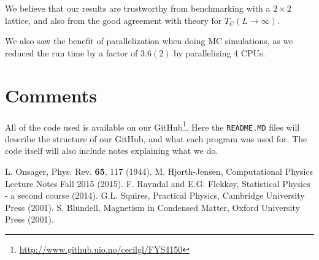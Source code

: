 \documentclass[%
 reprint,
nofootinbib,
aps,
]{revtex4-1}
\begin{document}
We believe that our results are trustworthy from benchmarking with a $2 \times 2$ lattice, and also from the good agreement with theory for $T_C(L\to\infty)$. 

We also saw the benefit of parallelization when doing MC simulations, as we reduced the run time by a factor of $3.6(2)$ by parallelizing 4 CPUs. 



\section{Comments}
All of the code used is available on our GitHub\footnote{\url{http://www.github.uio.no/cecilgl/FYS4150}}. Here the \texttt{README.MD} files will describe the structure of our GitHub, and what each program was used for. The code itself will also include notes explaining what we do.



\begin{thebibliography}{99}
 L. Onsager, Phys. Rev. \textbf{65}, 117 (1944).
 M. Hjorth-Jensen, Computational Physics Lecture Notes Fall 2015 (2015).
 F. Ravndal and E.G. Flekkøy, Statistical Physics - a second course (2014).
 G.L. Squires, Practical Physics, Cambridge University Press (2001).
 S. Blundell, Magnetism in Condensed Matter, Oxford University Press (2001).
\end{thebibliography}
\end{document}
